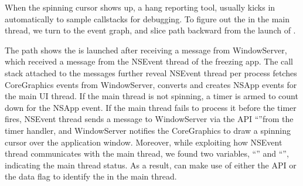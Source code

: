 When the spinning cursor shows up, a hang reporting tool, \spindump usually
kicks in automatically to sample callstacks for debugging. To figure out the
\spinningnode in the main thread, we turn to the event graph, and slice path
backward from the launch of \spindump.

The path shows the \spindump is launched after receiving a message from
WindowServer, which received a message from the NSEvent thread of the freezing
app. The call stack attached to the messages further reveal NSEvent thread per
process fetches CoreGraphics events from WindowServer, converts and creates
NSApp events for the main UI thread. If the main thread is not spinning, a timer
is armed to count down for the NSApp event. If the main thread fails to process
it before the timer fires, NSEvent thread sends a message to WindowServer
via the API ``''from the timer handler, and
WindowServer notifies the CoreGraphics to draw a spinning cursor over the
application window. Moreover, while exploiting how NSEvent thread communicates
with the main thread, we found two variables, ``''
and ``'', indicating the main thread status. As a
result, \xxx can make use of either the API or the data flag to identify the
\spinningnode in the main thread.
